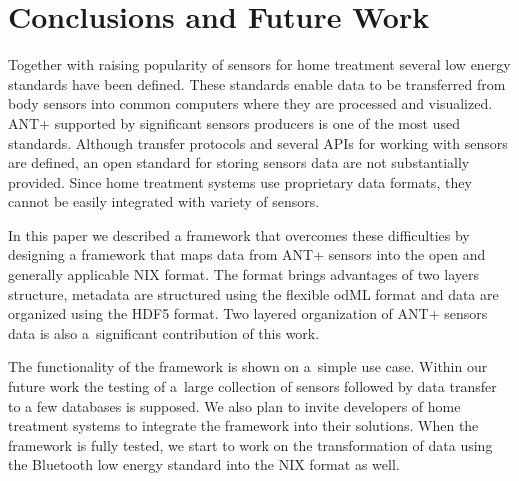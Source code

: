 \documentclass[conference]{IEEEtran}
\begin{document}
\section{Conclusions and Future Work}\label{sec:future-work}

Together with raising popularity of sensors for home treatment several low energy standards have been defined. These standards enable data to be transferred from body sensors into common computers where they are processed and visualized. ANT+ supported by significant sensors producers is one of the most used standards. Although transfer protocols and several APIs for working with sensors are defined, an open standard for storing sensors data are not substantially provided. Since home treatment systems use proprietary data formats, they cannot be easily integrated with variety of sensors. 

In this paper we described a framework that overcomes these difficulties by designing a framework that maps data from ANT+ sensors into the open and generally applicable NIX format. The format brings advantages of two layers structure, metadata are structured using the flexible odML format and data are organized using the HDF5 format. Two layered organization of ANT+ sensors data is also a~significant contribution of this work.

The functionality of the framework is shown on a~simple use case. Within our future work the testing of a~large collection of sensors followed by data transfer to a few databases is supposed. We also plan to invite developers of home treatment systems to integrate the framework into their solutions. When the framework is fully tested, we start to work on the transformation of data using the Bluetooth low energy standard into the NIX format as well.




\end{document}
